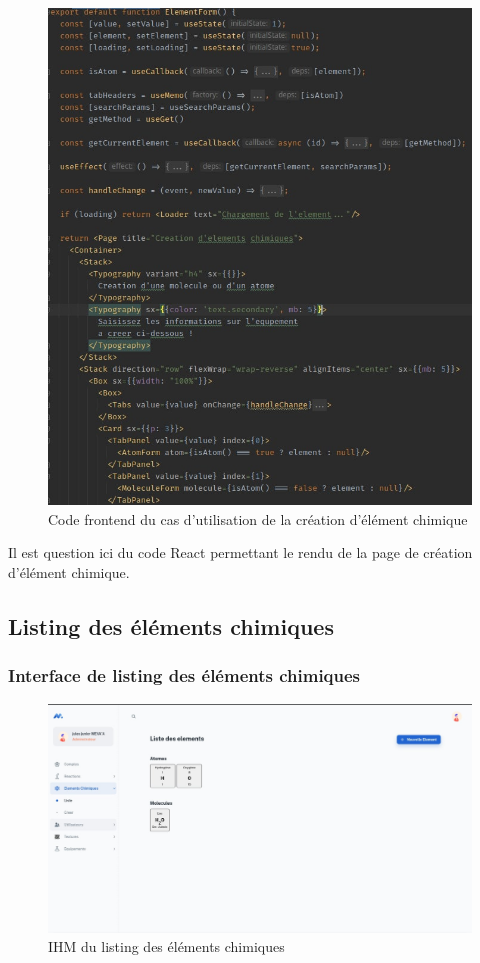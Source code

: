 \begin{figure}[H]
	\centering
	\includegraphics[width=1\textwidth]{img/fec}
	\caption{Code frontend du cas d'utilisation de la création d'élément chimique}
	\label{fig:mesh1}
\end{figure}

Il est question ici du code React permettant le rendu de la page de création d'élément chimique.

\subsection{Listing des éléments chimiques}

\subsubsection{Interface de listing des éléments chimiques}

\begin{figure}[H]
	\centering
	\includegraphics[width=1\textwidth]{img/ietl}
	\caption{IHM du listing des éléments chimiques}
	\label{fig:mesh1}
\end{figure}

